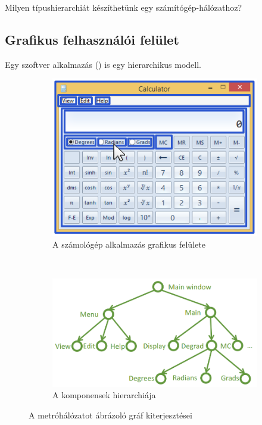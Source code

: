 \begin{feladat}
	Milyen típushierarchiát készíthetünk egy számítógép-hálózathoz?
\end{feladat}

\subsection{Grafikus felhasználói felület}

Egy szoftver alkalmazás \emph{} () is egy hierarchikus modell.

\begin{figure}[H]
	\begin{subfigure}[b]{0.5\textwidth}
		\centering
		\includegraphics[scale=0.4]{GUI-ablak}
		\caption{A számológép alkalmazás grafikus felülete}
		\label{fig:GUI-ablak}
	\end{subfigure}
	~
	\begin{subfigure}[b]{0.5\textwidth}
		\centering
		\includegraphics[scale=0.25]{GUI-hierarchia}
		\caption{A komponensek hierarchiája}
		\label{fig:GUI-hierarchia}
	\end{subfigure}
	\caption{A metróhálózatot ábrázoló gráf kiterjesztései}
\end{figure}

